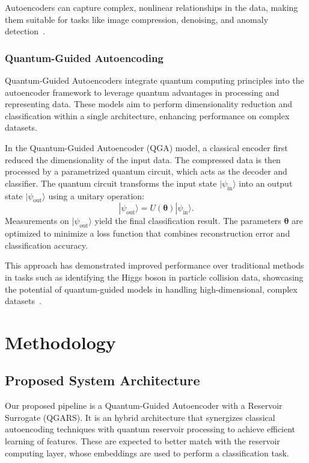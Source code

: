 \documentclass[conference]{IEEEtran}
\begin{document}
%


Autoencoders can capture complex, nonlinear 
relationships in the data, making them suitable for tasks 
like image compression, denoising, and anomaly 
detection~\cite{hintonReducingDimensionalityData2006, estevaGuideDeepLearning2019a}.

\subsubsection{Quantum-Guided Autoencoding}
Quantum-Guided Autoencoders integrate quantum computing principles into the autoencoder framework to leverage quantum advantages in processing and representing data. These models aim to perform dimensionality reduction and classification within a single architecture, enhancing performance on complex datasets.

In the Quantum-Guided Autoencoder (QGA) model, a classical encoder first reduced the dimensionality of the input data. The compressed data is then processed by a parametrized quantum circuit, which acts as the decoder and classifier. The quantum circuit transforms the input state \( |\psi_{\text{in}}\rangle \) into an output state \( |\psi_{\text{out}}\rangle \) using a unitary operation:
\begin{equation}
    |\psi_{\text{out}}\rangle = U(\bm\theta) |\psi_{\text{in}}\rangle.
\end{equation}
Measurements on \( |\psi_{\text{out}}\rangle \) yield the final classification result. The parameters \( \bm\theta \) are optimized to minimize a loss function that combines reconstruction error and classification accuracy.

This approach has demonstrated improved performance over traditional methods in tasks such as identifying the Higgs boson in particle collision data, showcasing the potential of quantum-guided models in handling high-dimensional, complex datasets~\cite{belisGuidedQuantumCompression2024}.


\section{Methodology}
\subsection{Proposed System Architecture}
Our proposed pipeline is a Quantum-Guided Autoencoder with a 
Reservoir Surrogate (QGARS). It is an hybrid architecture that 
synergizes classical autoencoding techniques with quantum reservoir processing to achieve efficient learning of features. These are expected to better match with the reservoir computing layer, whose embeddings are used to perform a classification task.
\end{document}
